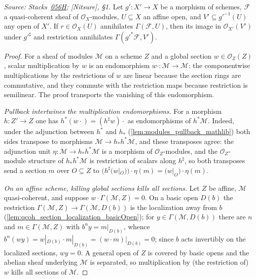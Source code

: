 \begin{lemma}\leanok
  \label{lem:annihilator_pullback_sections}
  \textit{Source:
  Stacks~\href{https://stacks.math.columbia.edu/tag/056H}{056H};
  [Nitsure], \S 1.}
  Let \(g' : X' \to X\) be a morphism of schemes, \(\mathcal{F}\) a
  quasi-coherent sheaf of \(\mathcal{O}_X\)-modules, \(U \subseteq X\) an
  affine open, and \(V' \subseteq g'^{-1}(U)\) any open of \(X'\).  If
  \(r \in \mathcal{O}_X(U)\) annihilates \(\Gamma(\mathcal{F}, U)\), then its
  image in \(\mathcal{O}_{X'}(V')\) under \(g'^\sharp\) and restriction
  annihilates \(\Gamma(g'^* \mathcal{F}, V')\).
\end{lemma}
\begin{proof}\leanok
  For a sheaf of modules \(\mathcal{M}\) on a scheme \(Z\) and a global
  section \(w \in \mathcal{O}_Z(Z)\), scalar multiplication by \(w\) is an
  endomorphism \(w \cdot : \mathcal{M} \to \mathcal{M}\): the componentwise
  multiplications by the restrictions of \(w\) are linear because the section
  rings are commutative, and they commute with the restriction maps because
  restriction is semilinear.  The proof transports the vanishing of this
  endomorphism.

  \emph{Pullback intertwines the multiplication endomorphisms.}  For a
  morphism \(h : Z' \to Z\) one has \(h^*(w \cdot) = (h^\sharp w) \cdot\) as
  endomorphisms of \(h^* \mathcal{M}\).  Indeed, under the adjunction between
  \(h^*\) and \(h_*\) (\cref{lem:modules_pullback_mathlib}) both sides
  transpose to morphisms \(\mathcal{M} \to h_* h^* \mathcal{M}\), and these
  transposes agree: the adjunction unit
  \(\eta : \mathcal{M} \to h_* h^* \mathcal{M}\) is a morphism of
  \(\mathcal{O}_Z\)-modules, and the \(\mathcal{O}_Z\)-module structure of
  \(h_* h^* \mathcal{M}\) is restriction of scalars along \(h^\sharp\), so
  both transposes send a section \(m\) over \(O \subseteq Z\) to
  \(\bigl(h^\sharp(w|_O)\bigr) \cdot \eta(m) = \bigl(w|_O\bigr) \cdot
  \eta(m)\).

  \emph{On an affine scheme, killing global sections kills all sections.}
  Let \(Z\) be affine, \(\mathcal{M}\) quasi-coherent, and suppose
  \(w \cdot \Gamma(\mathcal{M}, Z) = 0\).  On a basic open \(D(b)\) the
  restriction \(\Gamma(\mathcal{M}, Z) \to \Gamma(\mathcal{M}, D(b))\) is the
  localization away from \(b\)
  (\cref{lem:qcoh_section_localization_basicOpen}); for
  \(y \in \Gamma(\mathcal{M}, D(b))\) there are \(n\) and
  \(m \in \Gamma(\mathcal{M}, Z)\) with \(b^n y = m|_{D(b)}\), whence
  \(b^n (w y) = w|_{D(b)} \cdot m|_{D(b)} = (w \cdot m)|_{D(b)} = 0\); since
  \(b\) acts invertibly on the localized sections, \(w y = 0\).  A general
  open of \(Z\) is covered by basic opens and the abelian sheaf underlying
  \(\mathcal{M}\) is separated, so multiplication by (the restriction of)
  \(w\) kills all sections of \(\mathcal{M}\).


\end{proof}
